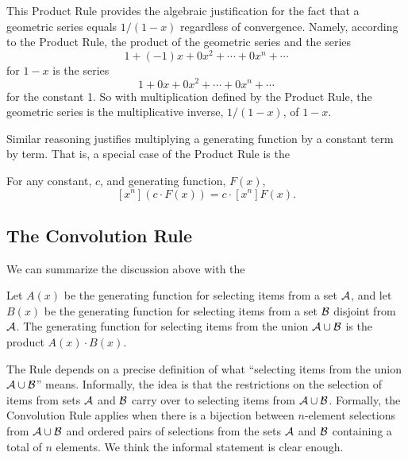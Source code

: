 This Product Rule provides the algebraic justification for the fact
that a geometric series equals $1/(1-x)$ regardless of convergence.
Namely, according to the Product Rule, the product of the geometric
series and the series
\[
1+ (-1)x+ 0x^2 + \cdots + 0x^n + \cdots
\]
for $1-x$ is the series
\[
1 + 0x+ 0x^2 +  \cdots + 0x^n + \cdots
\]
for the constant 1.  So with multiplication defined by the Product
Rule, the geometric series is the multiplicative inverse, $1/(1-x)$,
of $1-x$.

Similar reasoning justifies multiplying a generating function by a
constant term by term.  That is, a special case of the Product Rule is
the
\begin{rul*}
For any constant, $c$, and generating function, $F(x)$,
\begin{equation}\label{xncFcn}
[x^n](c \cdot F(x)) = c \cdot [x^n]F(x).
\end{equation}
\end{rul*}

\iffalse
Letting
\[
P(x) = (1-x) \cdot (1+x+x^2+\cdots+x^n+\cdots),
\]
the Product Rule gives
\begin{align*}
[x^0]P(x) & = 1 \cdot 1 = 1,\\
[x^{n+1}]P(x)& = 1\cdot 1+ (-1)\cdot 1 +0\cdot 1 +\cdots + 0\cdot 1 = 0.
\end{align*}
That is,
\[
P(x) = 1 + 0\cdot x +  0\cdot x^2 + \cdots = 1.
\]
\fi

\subsection{The Convolution Rule}

We can summarize the discussion above with the
\begin{mathrule*}\label{convolution_rule}
Let $A(x)$ be the generating function for selecting items from a set
${\cal A}$, and let $B(x)$ be the generating function for selecting
items from a set ${\cal B}$ disjoint from ${\cal A}$.  The generating
function for selecting items from the union ${\cal A} \cup {\cal B}$
is the product $A(x) \cdot B(x)$.
\end{mathrule*}

The Rule depends on a precise definition of what ``selecting items
from the union ${\cal A} \cup {\cal B}$'' means.  Informally, the idea
is that the restrictions on the selection of items from sets ${\cal
  A}$ and ${\cal B}$ carry over to selecting items from ${\cal A} \cup
{\cal B}$.  Formally, the Convolution Rule applies when there is a
bijection between $n$-element selections from ${\cal A} \cup {\cal B}$
and ordered pairs of selections from the sets ${\cal A}$ and ${\cal
  B}$ containing a total of $n$ elements.  We think the informal
statement is clear enough.

